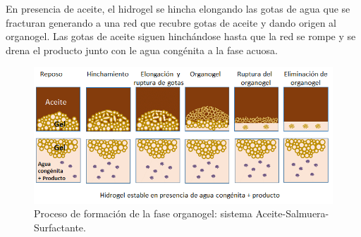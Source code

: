 En presencia de aceite, el hidrogel se hincha elongando las gotas de agua que se fracturan generando a una red que recubre gotas de aceite y dando origen al organogel. Las gotas de aceite siguen hinchándose hasta que la red se rompe y se drena el producto junto con le agua congénita a la fase acuosa.

\begin{figure}[h]
    \centering
    \includegraphics[width=\textwidth]{Graphics/Conclutions/coales_3.png}
    \caption[Proceso de emulsificación sin tensoactivos]{Proceso de formación de la fase organogel: sistema Aceite-Salmuera-Surfactante.}
    \label{fig:conclu3}
\end{figure}
